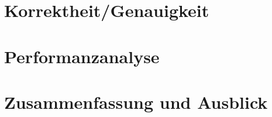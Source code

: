 \documentclass[course=erap]{aspdoc}
\begin{document}

\section{Korrektheit/Genauigkeit}


\section{Performanzanalyse}



\section{Zusammenfassung und Ausblick}


{}
\end{document}
